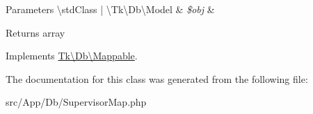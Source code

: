 \begin{DoxyParams}[1]{Parameters}
\textbackslash{}std\+Class | \textbackslash{}\+Tk\textbackslash{}\+Db\textbackslash{}\+Model & {\em \$obj} & \\
\hline
\end{DoxyParams}
\begin{DoxyReturn}{Returns}
array 
\end{DoxyReturn}


Implements \hyperlink{interfaceTk_1_1Db_1_1Mappable_aa4b9d1ab4a8a76798a75b03eecd93de7}{Tk\textbackslash{}\+Db\textbackslash{}\+Mappable}.



The documentation for this class was generated from the following file\+:\begin{DoxyCompactItemize}
\item 
src/\+App/\+Db/Supervisor\+Map.\+php\end{DoxyCompactItemize}
